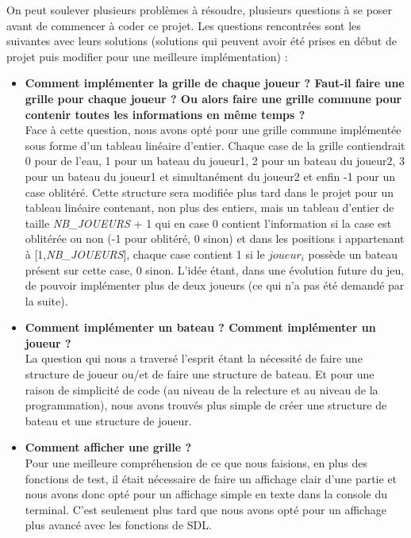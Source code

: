 \documentclass[11pt]{article}
\begin{document}
On peut soulever plusieurs problèmes à résoudre, plusieurs questions à se poser avant de commencer à coder ce projet. Les questions rencontrées sont les suivantes avec leurs solutions (solutions qui peuvent avoir été prises en début de projet puis modifier pour une meilleure implémentation) :\\
\begin{itemize}
\item \textbf{Comment implémenter la grille de chaque joueur ? Faut-il faire une grille pour chaque joueur ? Ou alors faire une grille commune pour contenir toutes les informations en même temps ?} \\
Face à cette question, nous avons opté pour une grille commune implémentée sous forme d'un tableau linéaire d'entier. Chaque case de la grille contiendrait 0 pour de l'eau, 1 pour un bateau du joueur1, 2 pour un bateau du joueur2, 3 pour un bateau du joueur1 et simultanément du joueur2 et enfin -1 pour un case oblitéré. Cette structure sera modifiée plus tard dans le projet pour un tableau linéaire contenant, non plus des entiers, mais un tableau d'entier de taille {\textit{NB\_JOUEURS}} + 1 qui en case 0 contient l'information si la case est oblitérée ou non (-1 pour oblitéré, 0 sinon) et dans les positions i appartenant à [1,{\textit{NB\_JOUEURS}}], chaque case contient 1 si le $joueur_{i}$ possède un bateau présent sur cette case, 0 sinon. L'idée étant, dans une évolution future du jeu, de pouvoir implémenter plus de deux joueurs (ce qui n'a pas été demandé par la suite).\\

\item \textbf{Comment implémenter un bateau ? Comment implémenter un joueur ?} \\
La question qui nous a traversé l'esprit étant la nécessité de faire une structure de joueur ou/et de faire une structure de bateau. Et pour une raison de simplicité de code (au niveau de la relecture et au niveau de la programmation), nous avons trouvés plus simple de créer une structure de bateau et une structure de joueur.\\

\item \textbf{Comment afficher une grille ?} \\ 
Pour une meilleure compréhension de ce que nous faisions, en plus des fonctions de test, il était nécessaire de faire un affichage clair d'une partie et nous avons donc opté pour un affichage simple en texte dans la console du terminal. C'est seulement plus tard que nous avons opté pour un affichage plus avancé avec les fonctions de SDL.\\
\end{itemize}
\begin{lstlisting}
\end{lstlisting}
\newpage
\end{document}
